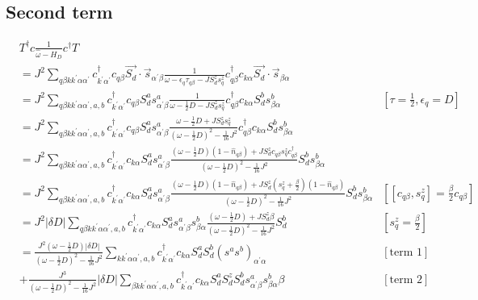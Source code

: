 \documentclass[12pt]{article}
\begin{document}
\subsection{Second term}
\begin{equation}\begin{aligned}
	&T^\dagger c \frac{1}{\hat \omega - H_D}c^\dagger T \\
	&= J^2\sum_{q\beta k k^\prime \alpha \alpha^\prime} c^\dagger_{k^\prime\alpha^\prime} c_{q\beta} \vec{S_d}\cdot\vec{s}_{\alpha^\prime \beta } \frac{1}{\omega - \epsilon_q\tau_{q\beta} - J S_d^z s_q^z}c^\dagger_{q\beta} c_{k\alpha} \vec{S_d}\cdot\vec{s}_{ \beta\alpha}\\
	&= J^2\sum_{q\beta k k^\prime \alpha \alpha^\prime,a,b} c^\dagger_{k^\prime\alpha^\prime} c_{q\beta} S_d^a s^a_{\alpha^\prime \beta} \frac{1}{\omega - \frac{1}{2}D - J S_d^z s_q^z}c^\dagger_{q\beta} c_{k\alpha} S_d^b s^b_{\beta \alpha} & \left[\tau = \frac{1}{2}, \epsilon_q = D\right] \\
	&= J^2\sum_{q\beta k k^\prime \alpha \alpha^\prime,a,b} c^\dagger_{k^\prime\alpha^\prime} c_{q\beta} S_d^a s^a_{\alpha^\prime \beta} \frac{\omega - \frac{1}{2}D + J S_d^z s_q^z}{\left(\omega - \frac{1}{2}D\right)^2 - \frac{1}{16}J^2}c^\dagger_{q\beta} c_{k\alpha} S_d^b s^b_{\beta \alpha} \\
	&= J^2\sum_{q\beta k k^\prime \alpha \alpha^\prime,a,b} c^\dagger_{k^\prime\alpha^\prime} c_{k\alpha} S_d^a s^a_{\alpha^\prime \beta} \frac{\left(\omega - \frac{1}{2}D\right) \left(1 - \hat n_{q\beta}\right) +  J S_d^z c_{q\beta} s_q^z c^\dagger_{q\beta}}{\left(\omega - \frac{1}{2}D\right)^2 - \frac{1}{16}J^2} S_d^b s^b_{\beta \alpha} \\
	&= J^2\sum_{q\beta k k^\prime \alpha \alpha^\prime,a,b} c^\dagger_{k^\prime\alpha^\prime} c_{k\alpha} S_d^a s^a_{\alpha^\prime \beta} \frac{\left(\omega - \frac{1}{2}D\right) \left(1 - \hat n_{q\beta}\right) +  J S_d^z \left(s_q^z + \frac{\beta}{2}\right) \left(1- \hat n_{q\beta}\right)}{\left(\omega - \frac{1}{2}D\right)^2 - \frac{1}{16}J^2} S_d^b s^b_{\beta \alpha} & \left[\left[c_{q\beta}, s_q^z\right] = \frac{\beta}{2} c_{q\beta}\right] \\
	&= J^2 |\delta D|\sum_{q\beta k k^\prime \alpha \alpha^\prime,a,b} c^\dagger_{k^\prime\alpha^\prime} c_{k\alpha} S_d^a s^a_{\alpha^\prime \beta}s^b_{\beta \alpha} \frac{\left(\omega - \frac{1}{2}D\right) + J S_d^z \beta}{\left(\omega - \frac{1}{2}D\right)^2 - \frac{1}{16}J^2} S_d^b & \left[s_q^z = \frac{\beta}{2}\right]  \\
	&= \frac{J^2\left(\omega - \frac{1}{2}D\right)|\delta D|}{\left(\omega - \frac{1}{2}D\right)^2 - \frac{1}{16}J^2} \sum_{k k^\prime \alpha \alpha^\prime,a,b} c^\dagger_{k^\prime\alpha^\prime} c_{k\alpha} S_d^a  S_d^b \left(s^a s^b\right)_{\alpha^\prime \alpha} & \left[\text{term 1}\right]\\
	&+ \frac{J^3}{\left(\omega - \frac{1}{2}D\right)^2 - \frac{1}{16}J^2} |\delta D|\sum_{\beta k k^\prime \alpha \alpha^\prime,a,b} c^\dagger_{k^\prime\alpha^\prime} c_{k\alpha} S_d^a S_d^z S_d^b s^a_{\alpha^\prime \beta} s^b_{\beta \alpha} \beta & \left[\text{term 2}\right] \\
\end{aligned}\end{equation}
\end{document}
